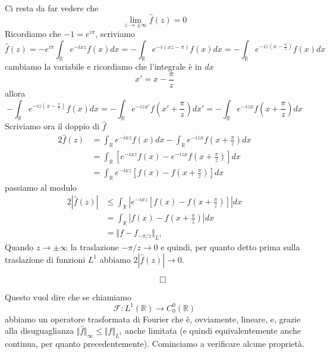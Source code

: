 Ci resta da far vedere che
\begin{equation*}
\lim\limits _{z\rightarrow \pm \infty }\hat{f}( z) =0
\end{equation*}
Ricordiamo che $-1=e^{i\pi }$, scriviamo
\begin{equation*}
\hat{f}( z) =-e^{i\pi }\int _{\mathbb{R}} e^{-ixz} f( x) dx=-\int _{\mathbb{R}} e^{-i( xz-\pi )} f( x) dx=-\int _{\mathbb{R}} e^{-iz\left( x-\frac{\pi }{z}\right)} f( x) dx
\end{equation*}
cambiamo la variabile e ricordiamo che l'integrale è in $dx$
\begin{equation*}
x'=x-\frac{\pi }{z}
\end{equation*}
allora
\begin{equation*}
-\int _{\mathbb{R}} e^{-iz\left( x-\frac{\pi }{z}\right)} f( x) dx=-\int _{\mathbb{R}} e^{-izx'} f\left( x'+\frac{\pi }{z}\right) dx'=-\int _{\mathbb{R}} e^{-izx} f\left( x+\frac{\pi }{z}\right) dx
\end{equation*}
Scriviamo ora il doppio di $\hat{f}$
\begin{align*}
2\hat{f}( z) & =\int _{\mathbb{R}} e^{-ixz} f( x) dx-\int _{\mathbb{R}} e^{-izx} f\left( x+\frac{\pi }{z}\right) dx\\
 & =\int _{\mathbb{R}}\left[ e^{-ixz} f( x) -e^{-izx} f\left( x+\frac{\pi }{z}\right)\right] dx\\
 & =\int _{\mathbb{R}} e^{-ixz}\left[ f( x) -f\left( x+\frac{\pi }{z}\right)\right] dx
\end{align*}
passiamo al modulo
\begin{align*}
2| \hat{f}( z)|  & \leqslant \int _{\mathbb{R}}\left| e^{-ixz}\left[ f( x) -f\left( x+\frac{\pi }{z}\right)\right]\right| dx\\
 & =\int _{\mathbb{R}}\left| f( x) -f\left( x+\frac{\pi }{z}\right)\right| dx\\
 & =\Vert f-f_{-\pi /z}\Vert _{L^{1}}
\end{align*}
Quando $z\rightarrow \pm \infty $ la traslazione $-\pi /z\rightarrow 0$ e quindi, per quanto detto prima sulla traslazione di funzioni $L^{1}$ abbiamo $2| \hat{f}( z)| \rightarrow 0$.

\begin{equation*}
\qed 
\end{equation*}

Questo vuol dire che se chiamiamo
\begin{equation*}
\mathcal{F} :L^{1}(\mathbb{R})\rightarrow C^{0}_{0}(\mathbb{R})
\end{equation*}
abbiamo un operatore trasformata di Fourier che è, ovviamente, lineare, e, grazie alla disuguaglianza $\Vert \hat{f}\Vert _{\infty } \leqslant \Vert f\Vert _{L^{1}}$ anche limitata (e quindi equivalentemente anche continua, per quanto precedentemente). Cominciamo a verificare alcune proprietà.

